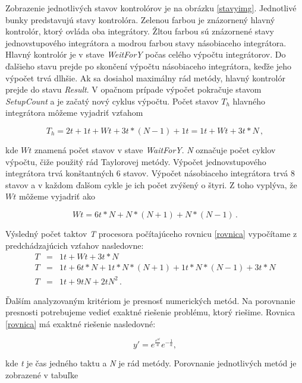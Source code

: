 Zobrazenie jednotlivých stavov kontrolórov je na obrázku \ref{stavyimg}. Jednotlivé bunky predstavujú stavy kontrolóra. Zelenou farbou je znázornený hlavný kontrolór, ktorý ovláda oba integrátory. Žltou farbou sú znázornené stavy jednovstupového integrátora a modrou farbou stavy násobiaceho integrátora. Hlavný kontrolór je v stave \textit{WeitForY} počas celého výpočtu integrátorov. Do ďalšieho stavu prejde po skončení výpočtu násobiaceho integrátora, keďže jeho výpočet trvá dlhšie. Ak sa dosiahol maximálny rád metódy, hlavný kontrolór prejde do stavu \textit{Result}. V opačnom prípade výpočet pokračuje stavom \textit{SetupCount} a je začatý nový cyklus výpočtu. Počet stavov $ T_h $ hlavného integrátora môžeme vyjadriť vzťahom

\begin{equation}
T_h = 2t + 1t + Wt + 3t*(N-1) + 1t = 1t + Wt + 3t*N \, ,
\end{equation}

kde $ Wt $ znamená počet stavov v stave \textit{WaitForY}. \textit{N} označuje počet cyklov výpočtu, čiže použitý rád Taylorovej metódy.
Výpočet jednovstupového integrátora trvá konštantných 6 stavov. Výpočet násobiaceho integrátora trvá 8 stavov a v každom ďalšom cykle je ich počet zvýšený o štyri. Z toho vyplýva, že $ Wt $ môžeme vyjadriť ako

\begin{equation}
Wt = 6t*N + N*(N+1) + N*(N-1) \, .
\end{equation}
\bigskip

Výsledný počet taktov \textit{T} procesora počítajúceho rovnicu \ref{rovnica} vypočítame z predchádzajúcich vzťahov nasledovne:
\begin{eqnarray}
T & = & 1t + Wt + 3t*N \nonumber \\ 
T & = & 1t + 6t*N + 1t*N*(N+1) + 1t*N*(N-1) + 3t*N \nonumber \\
T & = & 1t + 9tN + 2tN^2 \, .
\end{eqnarray}


Ďalším analyzovaným kritériom je presnosť numerických metód. Na porovnanie presnosti potrebujeme vedieť exaktné riešenie problému, ktorý riešime. Rovnica \ref{rovnica} má exaktné riešenie nasledovné:

\begin{equation}
y' = e^{\frac{e^{at}}{a}} e^{-\frac{1}{a}} ,
\end{equation}
\bigskip

kde \textit{t} je čas jedného taktu a \textit{N} je rád metódy.
Porovnanie jednotlivých metód je zobrazené v tabuľke  



